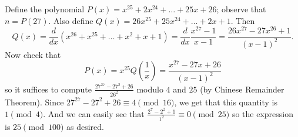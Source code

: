Define the polynomial $P(x)=x^{25}+2x^{24}+\ldots+25x+26$; observe that $n=P(27)$. Also define $Q(x)=26x^{25}+25x^{24}+\ldots+2x+1$. Then
\[
	Q(x)=\frac{d}{dx}(x^{26}+x^{25}+\ldots+x^2+x+1)=\frac{d}{dx}\frac{x^{27}-1}{x-1}=\frac{26x^{27}-27x^{26}+1}{(x-1)^2}.
\]
Now check that
\[
	P(x)=x^{25}Q\left(\frac{1}{x}\right)=\frac{x^{27}-27x+26}{(x-1)^2}
\]
so it suffices to compute $\frac{27^{27}-27^2+26}{26^2}$ modulo $4$ and $25$ (by Chinese Remainder Theorem). Since $27^{27}-27^2+26\equiv4\pmod{16}$, we get that this quantity is $1\pmod4$. And we can easily see that $\frac{2^7-2^2+1}{1^2}\equiv0\pmod{25}$ so the expression is $\boxed{25}\pmod{100}$ as desired.